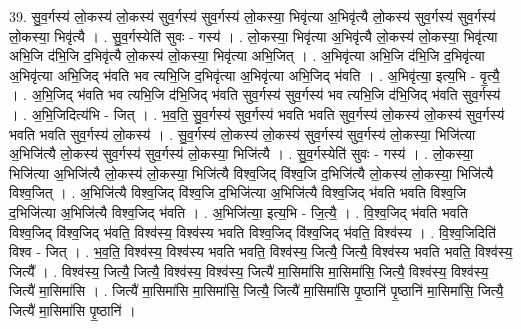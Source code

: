 \documentclass[17pt]{extarticle}
\begin{document}
39. सु॒व॒र्गस्य॑ लो॒कस्य॑ लो॒कस्य॑ सुव॒र्गस्य॑ सुव॒र्गस्य॑ लो॒कस्या॒ भिवृ॑त्या अ॒भिवृ॑त्यै लो॒कस्य॑ सुव॒र्गस्य॑ सुव॒र्गस्य॑ लो॒कस्या॒ भिवृ॑त्यै । . सु॒व॒र्गस्येति॑ सुवः - गस्य॑ । . लो॒कस्या॒ भिवृ॑त्या अ॒भिवृ॑त्यै लो॒कस्य॑ लो॒कस्या॒ भिवृ॑त्या अभि॒जि द॑भि॒जि द॒भिवृ॑त्यै लो॒कस्य॑ लो॒कस्या॒ भिवृ॑त्या अभि॒जित् । . अ॒भिवृ॑त्या अभि॒जि द॑भि॒जि द॒भिवृ॑त्या अ॒भिवृ॑त्या अभि॒जिद् भ॑वति भव त्यभि॒जि द॒भिवृ॑त्या अ॒भिवृ॑त्या अभि॒जिद् भ॑वति । . अ॒भिवृ॑त्या॒ इत्य॒भि - वृ॒त्यै॒ । . अ॒भि॒जिद् भ॑वति भव त्यभि॒जि द॑भि॒जिद् भ॑वति सुव॒र्गस्य॑ सुव॒र्गस्य॑ भव त्यभि॒जि द॑भि॒जिद् भ॑वति सुव॒र्गस्य॑ । . अ॒भि॒जिदित्य॑भि - जित् । . भ॒व॒ति॒ सु॒व॒र्गस्य॑ सुव॒र्गस्य॑ भवति भवति सुव॒र्गस्य॑ लो॒कस्य॑ लो॒कस्य॑ सुव॒र्गस्य॑ भवति भवति सुव॒र्गस्य॑ लो॒कस्य॑ । . सु॒व॒र्गस्य॑ लो॒कस्य॑ लो॒कस्य॑ सुव॒र्गस्य॑ सुव॒र्गस्य॑ लो॒कस्या॒ भिजि॑त्या अ॒भिजि॑त्यै लो॒कस्य॑ सुव॒र्गस्य॑ सुव॒र्गस्य॑ लो॒कस्या॒ भिजि॑त्यै । . सु॒व॒र्गस्येति॑ सुवः - गस्य॑ । . लो॒कस्या॒ भिजि॑त्या अ॒भिजि॑त्यै लो॒कस्य॑ लो॒कस्या॒ भिजि॑त्यै विश्व॒जिद् वि॑श्व॒जि द॒भिजि॑त्यै लो॒कस्य॑ लो॒कस्या॒ भिजि॑त्यै विश्व॒जित् । . अ॒भिजि॑त्यै विश्व॒जिद् वि॑श्व॒जि द॒भिजि॑त्या अ॒भिजि॑त्यै विश्व॒जिद् भ॑वति भवति विश्व॒जि द॒भिजि॑त्या अ॒भिजि॑त्यै विश्व॒जिद् भ॑वति । . अ॒भिजि॑त्या॒ इत्य॒भि - जि॒त्यै॒ । . वि॒श्व॒जिद् भ॑वति भवति विश्व॒जिद् वि॑श्व॒जिद् भ॑वति॒ विश्व॑स्य॒ विश्व॑स्य भवति विश्व॒जिद् वि॑श्व॒जिद् भ॑वति॒ विश्व॑स्य । . वि॒श्व॒जिदिति॑ विश्व - जित् । . भ॒व॒ति॒ विश्व॑स्य॒ विश्व॑स्य भवति भवति॒ विश्व॑स्य॒ जित्यै॒ जित्यै॒ विश्व॑स्य भवति भवति॒ विश्व॑स्य॒ जित्यै᳚ । . विश्व॑स्य॒ जित्यै॒ जित्यै॒ विश्व॑स्य॒ विश्व॑स्य॒ जित्यै॑ मा॒सिमा॑सि मा॒सिमा॑सि॒ जित्यै॒ विश्व॑स्य॒ विश्व॑स्य॒ जित्यै॑ मा॒सिमा॑सि । . जित्यै॑ मा॒सिमा॑सि मा॒सिमा॑सि॒ जित्यै॒ जित्यै॑ मा॒सिमा॑सि पृ॒ष्ठानि॑ पृ॒ष्ठानि॑ मा॒सिमा॑सि॒ जित्यै॒ जित्यै॑ मा॒सिमा॑सि पृ॒ष्ठानि॑ । \newline
\end{document}
